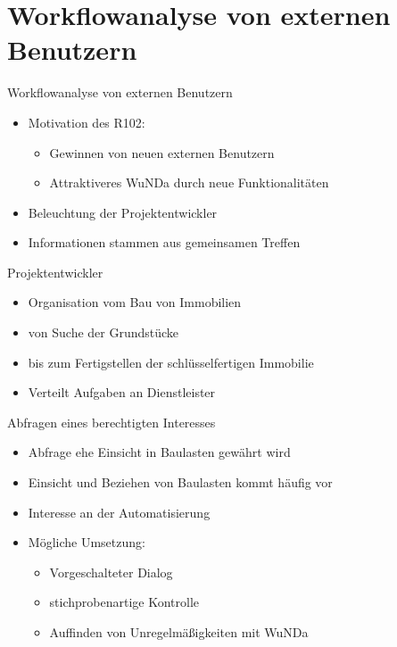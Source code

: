 \documentclass{beamer}
\begin{document}
\section{Workflowanalyse von externen Benutzern}

\begin{frame}{Workflowanalyse von externen Benutzern}
  \begin{itemize}
  \item
    Motivation des R102:
    \begin{itemize}
    \item Gewinnen von neuen externen Benutzern
    \item Attraktiveres WuNDa durch neue Funktionalitäten 
    \end{itemize}
    \pause
  \item
    Beleuchtung der Projektentwickler \pause
      \item
    Informationen stammen aus gemeinsamen Treffen
    \pause
  \end{itemize}
\end{frame}

\begin{frame}{Projektentwickler}
  \begin{itemize}
  \item
    Organisation vom Bau von Immobilien
    \pause
  \item
    von Suche der Grundstücke \pause
  \item bis zum Fertigstellen der schlüsselfertigen Immobilie  \pause
  \item Verteilt Aufgaben an Dienstleister
  \end{itemize}
\end{frame}

\begin{frame}{Abfragen eines berechtigten Interesses}
  \begin{itemize}
  \item
    Abfrage ehe Einsicht in Baulasten gewährt wird
    \pause
  \item
    Einsicht und Beziehen von Baulasten kommt häufig vor \pause
  \item Interesse an der Automatisierung \pause
  \item Mögliche Umsetzung:
  \begin{itemize}
  \item Vorgeschalteter Dialog \pause
  \item stichprobenartige Kontrolle
  \item Auffinden von Unregelmäßigkeiten mit WuNDa
  \end{itemize}
  \end{itemize}
\end{frame}
\end{document}

